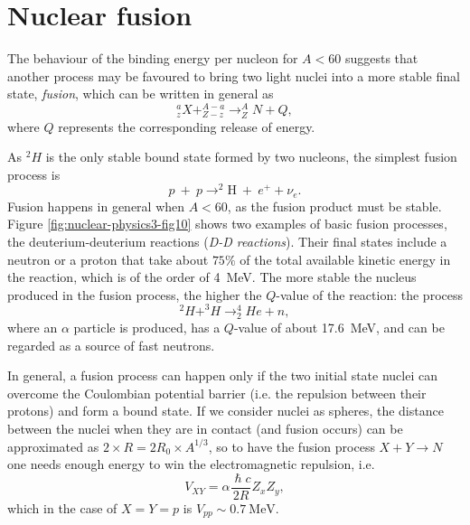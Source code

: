 \section{Nuclear fusion}
The behaviour of the binding energy per nucleon for \(A<60\) suggests that another process may be favoured to bring two light nuclei into a more stable final state, \emph{fusion}, which can be written in general as
\[
_z^aX + _{Z-z}^{A-a} \to _{Z}^AN + Q,
\]
where \(Q\) represents the corresponding release of energy.

As \(^2H\) is the only stable bound state formed by two nucleons, the simplest fusion process is
\begin{equation*}
    p~+~p \rightarrow ^{2}\mbox{H}~+~e^{+} + \nu_e.
\end{equation*}
Fusion happens in general when \(A<60\), as the fusion product must be stable.
Figure \ref{fig:nuclear-physics3-fig10} shows two examples of basic fusion processes, the deuterium-deuterium reactions (\emph{D-D reactions}). Their final states include a neutron or a proton that take about \(75\%\) of the total available kinetic energy in the reaction, which is of the order of \SI{4}{MeV}. The more stable the nucleus produced in the fusion process, the higher the \(Q\)-value of the reaction: the process
\[
^2H+^3H\to _2^4He+n,
\]
where an \(\alpha\) particle is produced, has a \(Q\)-value of about \SI{17.6}{MeV}, and can be regarded as a source of fast neutrons.

In general, a fusion process can happen only if the two initial state nuclei can overcome the Coulombian potential barrier (i.e. the repulsion between their protons) and form a bound state. If we consider nuclei as spheres, the distance between the nuclei when they are in contact (and fusion occurs) can be approximated as $2\times R=2R_0\times A^{1/3}$, so to have the fusion process \(X+Y\to N\)%
one needs enough energy to win the electromagnetic repulsion, i.e.
\begin{equation*}
    V_{XY} = \alpha\frac{\hslash c}{2R}Z_{x}Z_{y},
\end{equation*}
which in the case of \(X=Y=p\) is \(V_{pp}\sim 0.7 ~\mbox{MeV}\).

